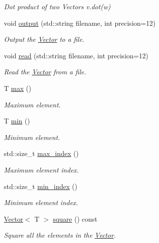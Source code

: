 \begin{DoxyCompactItemize}
\begin{DoxyCompactList}\small\item\em Dot product of two Vectors v.\+dot(w) \end{DoxyCompactList}\item 
void \hyperlink{classLuna_1_1Vector_aac601f8185b989cc0865fdc0c86483ca}{output} (std\+::string filename, int precision=12)
\begin{DoxyCompactList}\small\item\em Output the \hyperlink{classLuna_1_1Vector}{Vector} to a file. \end{DoxyCompactList}\item 
void \hyperlink{classLuna_1_1Vector_ac88b73bb16a6052fb68a8994ce2c7e94}{read} (std\+::string filename, int precision=12)
\begin{DoxyCompactList}\small\item\em Read the \hyperlink{classLuna_1_1Vector}{Vector} from a file. \end{DoxyCompactList}\item 
T \hyperlink{classLuna_1_1Vector_aaf2ae5f1e98f1f93c2f6262ea3c574b8}{max} ()
\begin{DoxyCompactList}\small\item\em Maximum element. \end{DoxyCompactList}\item 
T \hyperlink{classLuna_1_1Vector_a6d60809efe2e6d25d16ffa27303bd474}{min} ()
\begin{DoxyCompactList}\small\item\em Minimum element. \end{DoxyCompactList}\item 
std\+::size\+\_\+t \hyperlink{classLuna_1_1Vector_af7de15d570fa6cc999b5c900c220aaa5}{max\+\_\+index} ()
\begin{DoxyCompactList}\small\item\em Maximum element index. \end{DoxyCompactList}\item 
std\+::size\+\_\+t \hyperlink{classLuna_1_1Vector_abb6b63a716faec0dacce220eb82424f8}{min\+\_\+index} ()
\begin{DoxyCompactList}\small\item\em Minimum element index. \end{DoxyCompactList}\item 
\hyperlink{classLuna_1_1Vector}{Vector}$<$ T $>$ \hyperlink{classLuna_1_1Vector_a60f8017f50e602151c84686ac081af66}{square} () const
\begin{DoxyCompactList}\small\item\em Square all the elements in the \hyperlink{classLuna_1_1Vector}{Vector}. \end{DoxyCompactList}\item 

\end{DoxyCompactItemize}
